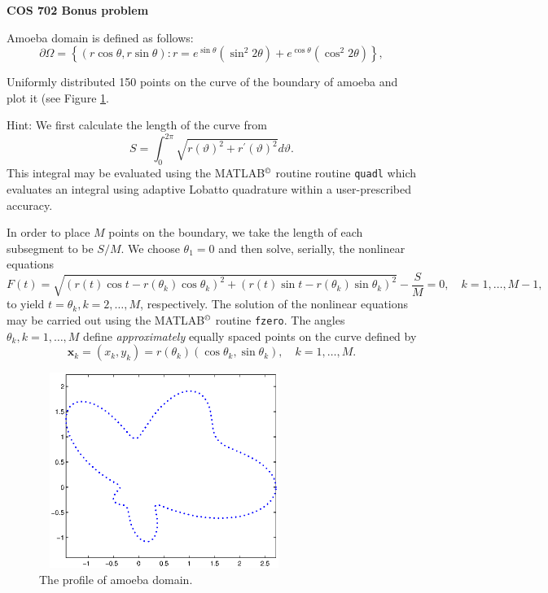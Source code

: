 \documentclass{article}%
\newcommand{\bbb}[1]{{\boldsymbol  #1 }}
\newcommand{\vth}{{\vartheta}}
\begin{document}
\begin{center}
\textbf{COS 702 Bonus problem}
\end{center}
Amoeba domain is defined as follows: %
\[
\partial\Omega=\left\{  \left(  r\cos\theta,r\sin\theta\right)  :r=e^{\sin
\theta}\left(  \sin^{2}2\theta\right)  +e^{\cos\theta}\left(  \cos^{2}%
2\theta\right)  \right\}  ,
\]

Uniformly distributed 150 points on the curve of the boundary of amoeba and plot it (see Figure \ref{fig}.


\bigskip

Hint:
We first calculate the length of the curve from
\begin{equation}\label{ApprLength2}
S=\int_0^{2\pi} \sqrt{r(\vth)^2+r^\prime(\vth)^2} d\vth.
\end{equation}
This integral may be evaluated using the MATLAB$^\copyright$ routine  routine {\tt quadl} which evaluates an integral using adaptive Lobatto quadrature within a user-prescribed accuracy.


In order to place $M$  points on the boundary, we take the length of each subsegment to be $S/M$.
We choose $\theta_1=0$ and then solve, serially, the nonlinear equations
\begin{equation}\label{NonlinearEq}
F(t)=\sqrt{\left(r(t)\cos t-r(\theta_{k})\cos\theta_{k}\right)^2+\left(r(t)\sin t-r(\theta_{k})\sin\theta_{k}\right)^2} -
\dfrac{S}{M} =0, \quad k=1, \ldots, M-1,
\end{equation}
to yield $t=\theta_k, k=2, \ldots, M$, respectively. The solution of the nonlinear equations may be carried out using the
MATLAB$^\copyright$ routine {\tt fzero}. The angles $\theta_k, k=1, \ldots, M$ define {\sl approximately} equally spaced points on the curve defined by
\begin{equation}\label{CollocationPts4}
\bbb{x}_k=({x}_k, {y}_k) =r(\theta_k) (\cos \theta_k, \sin \theta_k), \quad k=1, \dots, {M}.
\end{equation}


\begin{figure}[h]
\begin{center}
\includegraphics[height=2.5in,width=3.2in]{amoeba_fig.eps}
\end{center}
\caption{The profile of amoeba domain.}\label{fig}%
\end{figure}
\end{document}

